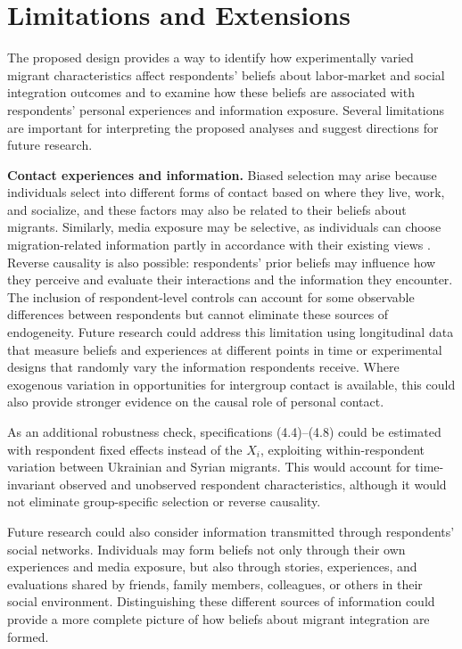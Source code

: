 \section{Limitations and Extensions}

The proposed design provides a way to identify how experimentally varied migrant characteristics affect respondents' beliefs about labor-market and social integration outcomes and to examine how these beliefs are associated with respondents' personal experiences and information exposure. Several limitations are important for interpreting the proposed analyses and suggest directions for future research.\bigskip

\noindent\textbf{Contact experiences and information.} Biased selection may arise because individuals select into different forms of contact based on where they live, work, and socialize, and these factors may also be related to their beliefs about migrants. Similarly, media exposure may be selective, as individuals can choose migration-related information partly in accordance with their existing views \citep{lueders2019refugees}. Reverse causality is also possible: respondents' prior beliefs may influence how they perceive and evaluate their interactions and the information they encounter. The inclusion of respondent-level controls can account for some observable differences between respondents but cannot eliminate these sources of endogeneity. Future research could address this limitation using longitudinal data that measure beliefs and experiences at different points in time or experimental designs that randomly vary the information respondents receive. Where exogenous variation in opportunities for intergroup contact is available, this could also provide stronger evidence on the causal role of personal contact. 

As an additional robustness check, specifications (4.4)--(4.8) could be estimated with respondent fixed effects instead of the \(X_i\), exploiting within-respondent variation between Ukrainian and Syrian migrants. This would account for time-invariant observed and unobserved respondent characteristics, although it would not eliminate group-specific selection or reverse causality.

Future research could also consider information transmitted through respondents' social networks. Individuals may form beliefs not only through their own experiences and media exposure, but also through stories, experiences, and evaluations shared by friends, family members, colleagues, or others in their social environment. Distinguishing these different sources of information could provide a more complete picture of how beliefs about migrant integration are formed.
\bigskip

